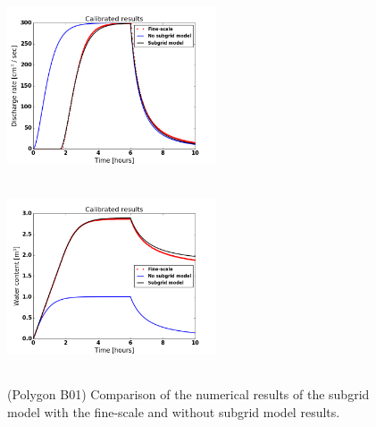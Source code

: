 \documentclass[review,11pt]{elsarticle}
\begin{document}
\begin{figure}[!h]
\centering
\includegraphics[width=6.2cm, height=5.5cm]{./figures/POLYGON_B01/POLYGON_B01dischargeCalibDDManning.png}
\includegraphics[width=6.2cm, height=5.5cm]{./figures/POLYGON_B01/POLYGON_B01watercontentCalibDDManning.png}
\caption{(Polygon B01) Comparison of the numerical results of the subgrid model with the fine-scale and without subgrid model results.}
\label{polygon-B01}
\end{figure}
\end{document}

